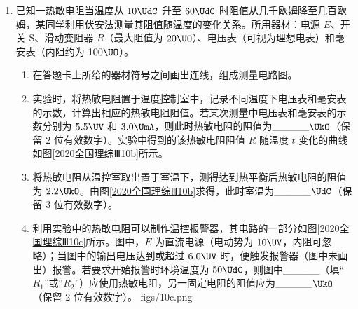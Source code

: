 \documentclass[\gkver]{gaokaozhenti}
\begin{document}
\begin{enumerate}
\item
已知一热敏电阻当温度从 $10\UdC$ 升至 $60\UdC$ 时阻值从几千欧姆降至几百欧姆，某同学利用伏安法测量其阻值随温度的变化关系。所用器材：电源 $E$、开关 S、滑动变阻器 $R$（最大阻值为 $20\UO$）、电压表（可视为理想电表）和毫安表（内阻约为 $100\UO$）。
\begin{enumerate}
	\item
	在答题卡上所给的器材符号之间画出连线，组成测量电路图。
	\item
	实验时，将热敏电阻置于温度控制室中，记录不同温度下电压表和毫安表的示数，计算出相应的热敏电阻阻值。若某次测量中电压表和毫安表的示数分别为 $5.5\UV$ 和 $3.0\UmA$，则此时热敏电阻的阻值为\_\_\_\_\_$\UkO$（保留 2 位有效数字）。实验中得到的该热敏电阻阻值 $R$ 随温度 $t$ 变化的曲线如图\ref{2020全国理综Ⅲ10b}所示。
	\item
	将热敏电阻从温控室取出置于室温下，测得达到热平衡后热敏电阻的阻值为 $2.2\UkO$。由图\ref{2020全国理综Ⅲ10b}求得，此时室温为\_\_\_\_\_$\UdC$（保留 3 位有效数字）。
	\item
	利用实验中的热敏电阻可以制作温控报警器，其电路的一部分如图\ref{2020全国理综Ⅲ10c}所示。图中，$E$ 为直流电源（电动势为 $10\UV$，内阻可忽略）；当图中的输出电压达到或超过 $6.0\UV$ 时，便触发报警器（图中未画出）报警。若要求开始报警时环境温度为 $50\UdC$，则图中\_\_\_\_\_（填“$R_{1}$”或“$R_{2}$”）应使用热敏电阻，另一固定电阻的阻值应为\_\_\_\_\_$\UkO$（保留 2 位有效数字）。
	{figs/10c.png}
\end{enumerate}


\end{enumerate}
\end{document}
